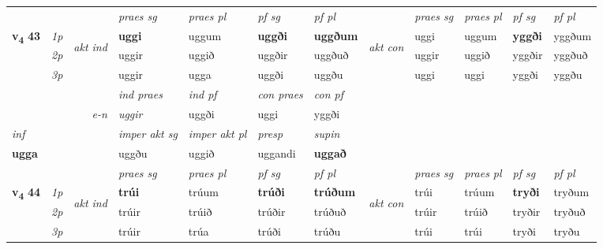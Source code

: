 \begin{longtable}[l]{X>{\footnotesize\itshape}llXXXXlXXXX}
 & &   & \textit{praes sg}  & \textit{praes pl}    & \textit{ pf sg} & \textit{pf pl} & & \textit{praes sg}  & \textit{praes pl}    & \textit{pf sg} & \textit{pf pl }  \\ \cmidrule{4-7} \cmidrule{9-12}
 \multirow{2}{*}{{{\textbf{v{\textsubscript{4}}} \Large{\textbf{43}}}}}  & 1p & \multirow{3}{*}{\begin{turn}{90}\textit{akt ind}\end{turn}} & \textbf{uggi} & uggum & \textbf{uggði} & \textbf{uggðum} & \multirow{3}{*}{\begin{turn}{90}\textit{akt con}\end{turn}} &uggi & uggum & \textbf{yggði} & yggðum\\*
 & 2p &  &  uggir  & uggið & uggðir & uggðuð & & uggir & uggið & yggðir & yggðuð \\*
 & 3p &  & uggir & ugga & uggði & uggðu & & uggi & uggi& yggði & yggðu \\*
\cmidrule{4-7} \cmidrule{9-12}

   && &  \textit{ind praes} & \textit{ind pf} & \textit{con praes} & \textit{con pf} \\*
\multicolumn{3}{r}{\textit{e-n}} & uggir & uggði & uggi & yggði \\*

\cmidrule{4-7}
   {\textit{inf}} & &  & \textit{imper akt sg} & \textit{imper akt pl}   & \textit{presp} & \textit{supin}   \\*
  {\textbf{ugga}} & && uggðu  & uggið   & uggandi &  \textbf{uggað}   \\*

\midrule

 & &   & \textit{praes sg}  & \textit{praes pl}    & \textit{ pf sg} & \textit{pf pl} & & \textit{praes sg}  & \textit{praes pl}    & \textit{pf sg} & \textit{pf pl }  \\ \cmidrule{4-7} \cmidrule{9-12}
 \multirow{2}{*}{{{\textbf{v{\textsubscript{4}}} \Large{\textbf{44}}}}}  & 1p & \multirow{3}{*}{\begin{turn}{90}\textit{akt ind}\end{turn}} & \textbf{trúi} & trúum & \textbf{trúði} & \textbf{trúðum} & \multirow{3}{*}{\begin{turn}{90}\textit{akt con}\end{turn}} &trúi & trúum & \textbf{tryði} & tryðum\\*
 & 2p &  &  trúir  & trúið & trúðir & trúðuð & & trúir & trúið & tryðir & tryðuð \\*
 & 3p &  & trúir & trúa & trúði & trúðu & & trúi & trúi& tryði & tryðu \\*
\cmidrule{4-7} \cmidrule{9-12}


\end{longtable}
